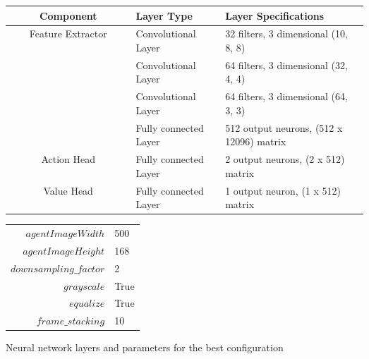 \begin{figure}
    \begin{center}
        \begin{tabular}{|| c | p{0.25\linewidth} | p{0.4\linewidth} ||}
            \hline
            Component                          & Layer Type            & Layer Specifications                     \\ [0.5ex]
            \hline\hline
            \multirow{4}{*}{Feature Extractor} & Convolutional Layer   & 32 filters, 3 dimensional (10, 8, 8)     \\\cline{2-3}
                                               & Convolutional Layer   & 64 filters, 3 dimensional (32, 4, 4)     \\\cline{2-3}
                                               & Convolutional Layer   & 64 filters, 3 dimensional (64, 3, 3)     \\\cline{2-3}
                                               & Fully connected Layer & 512 output neurons, (512 x 12096) matrix \\
            \hline
            Action Head                        & Fully connected Layer & 2 output neurons, (2 x 512) matrix       \\
            \hline
            Value Head                         & Fully connected Layer & 1 output neuron, (1 x 512) matrix        \\
            \hline
        \end{tabular}
        \begin{tabular}{r@{: }l}
            $agentImageWidth$      & 500  \\
            $agentImageHeight$     & 168  \\
            $downsampling\_factor$ & 2    \\
            $grayscale$            & True \\
            $equalize$             & True \\
            $frame\_stacking$      & 10   \\
        \end{tabular}
    \end{center}
    \caption{Neural network layers and parameters for the best configuration}
    \label{fig:network_architecture}
\end{figure}

